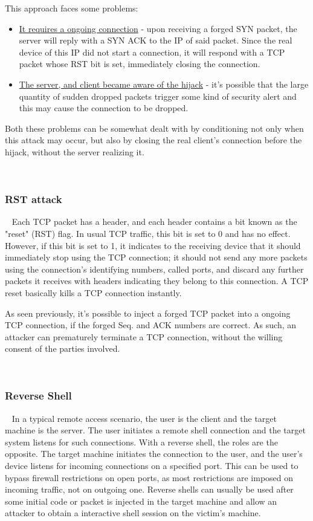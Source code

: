 This approach faces some problems: 
\begin{itemize}
    \item \underline{It requires a ongoing connection} - upon receiving a forged
        SYN packet, the server will reply with a SYN ACK to the IP of said 
        packet. 
        Since the real device of this IP did not start a connection, it will
        respond with a TCP packet whose RST bit is set, immediately closing the
        connection.

    \item \underline{The server, and client became aware of the 
        hijack} - it's possible that the large quantity of sudden dropped 
        packets trigger some kind of security alert and this may cause the 
        connection to be dropped.
\end{itemize}

Both these problems can be somewhat dealt with by conditioning not only 
when this attack may occur, but also by closing the real client's connection 
before the hijack, without the server realizing it.

~
\subsubsection{RST attack}

~\newline
Each TCP packet has a header, and each header contains a bit known as the 
"reset" (RST) flag. 
In usual TCP traffic, this bit is set to 0 and has no effect.
However, if this bit is set to 1, it indicates to the receiving device that 
it should immediately stop using the TCP connection; 
it should not send any more packets using the connection's identifying numbers, 
called ports, and discard any further packets it receives with headers 
indicating they belong to this connection. 
A TCP reset basically kills a TCP connection instantly. 

As seen previously, it's possible to inject a forged TCP packet into a ongoing 
TCP connection, if the forged Seq. and ACK numbers are correct. 
As such, an attacker can prematurely terminate a TCP connection, without the 
willing consent of the parties involved.

~
\subsubsection{Reverse Shell}

~\newline
In a typical remote access scenario, the user is the client and the target 
machine is the server. 
The user initiates a remote shell connection and the target system listens 
for such connections. 
With a reverse shell, the roles are the opposite. 
The target machine initiates the connection to the user, and the 
user’s device listens for incoming connections on a specified port.
This can be used to bypass firewall restrictions on open ports, as most 
restrictions are imposed on incoming traffic, not on outgoing one.
Reverse shells can usually be used after some initial code or packet is 
injected in the target machine and allow an attacker to obtain a interactive 
shell session on the victim's machine.
